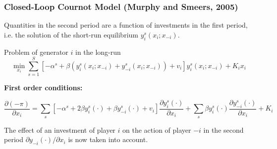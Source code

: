 \begin{frame}
					
\frametitle{Closed-Loop Cournot Model (Murphy and Smeers, 2005)}

Quantities in the second period are a function of investments in the first period, i.e. the solution of the short-run equilibrium $y_i^s(x_i;x_{-i})$.

\vspace{0.3cm}
\begin{beamerboxesrounded}{Problem of generator $i$ in the \alert{long-run}}
\begin{equation}
	\min_{x_i} \sum_{s=1}^S \left[ - \alpha^s + \beta( y_i^s(x_i;x_{-i})+ y_{-i}^s(x_i;x_{-i})) + v_i \right] y_i^s(x_i;x_{-i}) + K_i x_i
\end{equation}
\end{beamerboxesrounded}
\vspace{0.3cm}

\textbf{First order conditions:}

\begin{equation}
	\frac{\partial (- \pi)}{\partial x_i} = \sum_s \left[-\alpha^s + 2 \beta y_i^s (\cdot) + \beta y_{-i}^s(\cdot) + v_i \right] \frac{\partial y_i^s (\cdot)}{\partial x_i} + \sum_s \beta y_i^s (\cdot) \frac{\partial y_{-i}^s (\cdot)}{\partial x_i} + K_i
\end{equation}

The effect of an investment of player $i$ on the action of player $-i$ in the second period $\partial y_{-i} (\cdot)/\partial x_i$ is now taken into account.


							\end{frame}